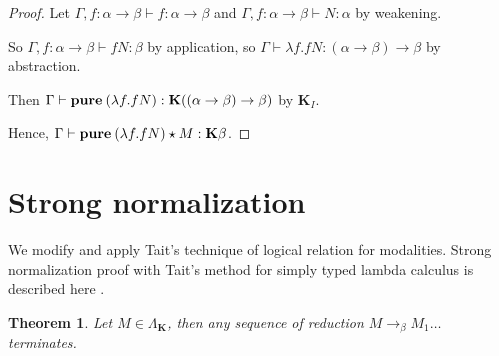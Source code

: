 \documentclass[a4paper]{article}
\newtheorem{theorem}{Theorem}
\begin{document}
\begin{proof}
  Let $\Gamma, f : \alpha \to \beta \vdash f : \alpha \to \beta$ and $\Gamma, f : \alpha \to \beta \vdash N :
  \alpha$ by weakening.

  So $\Gamma, f : \alpha \to \beta \vdash f N : \beta$ by application, so $\Gamma \vdash \lambda f. f N :
  (\alpha \to \beta) \to \beta$ by abstraction.

  Then $\Gamma \vdash {\bf pure \: } (\lambda f. f N) : \textbf{K}((\alpha \to \beta) \to \beta)$ by $\textbf{K}_I$.

  Hence, $\Gamma \vdash {\bf pure \: } (\lambda f. f N) \star M : \textbf{K}\beta$.

  \end{proof}


  \vspace{\baselineskip}


\section{Strong normalization}

  We modify and apply Tait's technique of logical relation for modalities. Strong normalization proof with Tait's method for simply typed lambda calculus is described here \cite{Pierce}.


  \begin{theorem}

    Let $M \in \Lambda_{\textbf{K}}$, then any sequence of reduction $M \rightarrow_{\beta} M_1 \dots$ terminates.

  \end{theorem}
\end{document}
